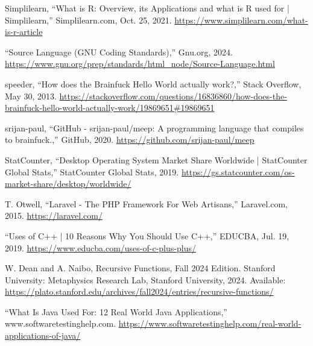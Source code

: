 \documentclass[12pt]{report} %
\begin{document}
\begin{singlespace}
\begin{thebibliography}{}
             Simplilearn, “What is R: Overview, its Applications and what is R used for | Simplilearn,” Simplilearn.com, Oct. 25, 2021. \href{https://www.simplilearn.com/what-is-r-article}{https://www.simplilearn.com/what-is-r-article}
            
              “Source Language (GNU Coding Standards),” Gnu.org, 2024. \href{https://www.gnu.org/prep/standards/html_node/Source-Language.html}{https://www.gnu.org/prep/standards/html\_node/Source-Language.html}
            
             speeder, “How does the Brainfuck Hello World actually work?,” Stack Overflow, May 30, 2013. \href{https://stackoverflow.com/questions/16836860/how-does-the-brainfuck-hello-world-actually-work/19869651#19869651}{https://stackoverflow.com/questions/16836860/how-does-the-brainfuck-hello-world-actually-work/19869651\#19869651}
            
             srijan-paul, “GitHub - srijan-paul/meep: A programming language that compiles to brainfuck.,” GitHub, 2020. \href{https://github.com/srijan-paul/meep}{https://github.com/srijan-paul/meep}
            
             StatCounter, “Desktop Operating System Market Share Worldwide | StatCounter Global Stats,” StatCounter Global Stats, 2019. \href{https://gs.statcounter.com/os-market-share/desktop/worldwide/}{https://gs.statcounter.com/os-market-share/desktop/worldwide/}
            
             T. Otwell, “Laravel - The PHP Framework For Web Artisans,” Laravel.com, 2015. \href{https://laravel.com/}{https://laravel.com/}
            
             “Uses of C++ | 10 Reasons Why You Should Use C++,” EDUCBA, Jul. 19, 2019. \href{https://www.educba.com/uses-of-c-plus-plus/}{https://www.educba.com/uses-of-c-plus-plus/}
            
             W. Dean and A. Naibo, Recursive Functions, Fall 2024 Edition. Stanford University: Metaphysics Research Lab, Stanford University, 2024. Available: \href{https://plato.stanford.edu/archives/fall2024/entries/recursive-functions/}{https://plato.stanford.edu/archives/fall2024/entries/recursive-functions/}

             “What Is Java Used For: 12 Real World Java Applications,” www.softwaretestinghelp.com. \href{https://www.softwaretestinghelp.com/real-world-applications-of-java/}{https://www.softwaretestinghelp.com/real-world-applications-of-java/}


\end{thebibliography}
\end{singlespace}
\end{document}
